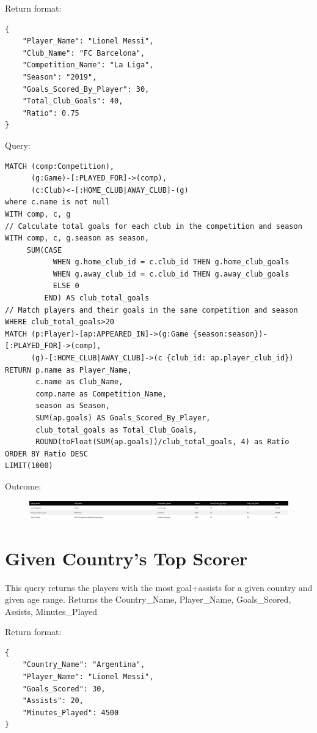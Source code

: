 \documentclass{Configuration_Files/PoliMi3i_thesis}
\begin{document}
Return format:
\begin{lstlisting}[style=json]
{
    "Player_Name": "Lionel Messi",
    "Club_Name": "FC Barcelona",
    "Competition_Name": "La Liga",
    "Season": "2019",
    "Goals_Scored_By_Player": 30,
    "Total_Club_Goals": 40,
    "Ratio": 0.75
}
\end{lstlisting}


Query:

\begin{lstlisting}[language=Cypher]
MATCH (comp:Competition), 
      (g:Game)-[:PLAYED_FOR]->(comp),
      (c:Club)<-[:HOME_CLUB|AWAY_CLUB]-(g)
where c.name is not null
WITH comp, c, g
// Calculate total goals for each club in the competition and season
WITH comp, c, g.season as season,
     SUM(CASE 
           WHEN g.home_club_id = c.club_id THEN g.home_club_goals 
           WHEN g.away_club_id = c.club_id THEN g.away_club_goals 
           ELSE 0 
         END) AS club_total_goals
// Match players and their goals in the same competition and season
WHERE club_total_goals>20
MATCH (p:Player)-[ap:APPEARED_IN]->(g:Game {season:season})-[:PLAYED_FOR]->(comp), 
      (g)-[:HOME_CLUB|AWAY_CLUB]->(c {club_id: ap.player_club_id})
RETURN p.name as Player_Name, 
       c.name as Club_Name, 
       comp.name as Competition_Name, 
       season as Season, 
       SUM(ap.goals) AS Goals_Scored_By_Player, 
       club_total_goals as Total_Club_Goals,
       ROUND(toFloat(SUM(ap.goals))/club_total_goals, 4) as Ratio
ORDER BY Ratio DESC
LIMIT(1000)
\end{lstlisting}


Outcome:
\begin{figure}[H]
    \centering
    \includegraphics[width=\linewidth]{Project Template/Images/query_output/q10.png}
\end{figure}





\section{Given Country's Top Scorer}
This query returns the players with the most goal+assists for a given country and given age range.
Returns the Country\_Name, Player\_Name, Goals\_Scored, Assists, Minutes\_Played

Return format:
\begin{lstlisting}[style=json]
{
    "Country_Name": "Argentina",
    "Player_Name": "Lionel Messi",
    "Goals_Scored": 30,
    "Assists": 20,
    "Minutes_Played": 4500
}
\end{lstlisting}
\end{document}
